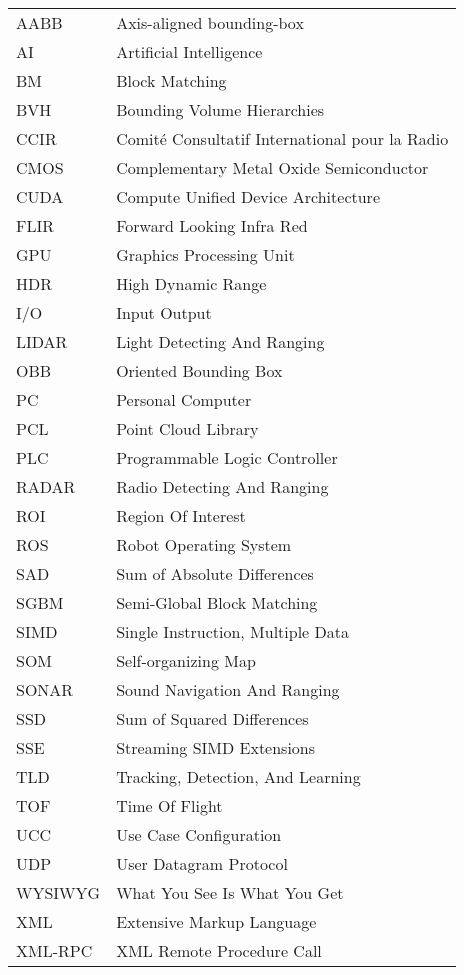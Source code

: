 \documentclass[12pt,a4paper,oneside,pdftex]{report}
\begin{document}
\noindent
\begin{longtable}{@{}p{}p{}@{}}
AABB & Axis-aligned bounding-box \\
AI & Artificial Intelligence \\
BM & Block Matching \\
BVH & Bounding Volume Hierarchies \\
CCIR & Comité Consultatif International pour la Radio \\
CMOS & Complementary Metal Oxide Semiconductor \\
CUDA & Compute Unified Device Architecture \\
FLIR & Forward Looking Infra Red \\
GPU & Graphics Processing Unit \\
HDR & High Dynamic Range \\
I/O & Input Output\\
LIDAR & Light Detecting And Ranging \\
OBB & Oriented Bounding Box \\
PC & Personal Computer \\
PCL & Point Cloud Library \\
PLC & Programmable Logic Controller \\
RADAR & Radio Detecting And Ranging \\
ROI & Region Of Interest \\
ROS & Robot Operating System \\
SAD & Sum of Absolute Differences \\
SGBM & Semi-Global Block Matching \\
SIMD & Single Instruction, Multiple Data \\
SOM & Self-organizing Map \\
SONAR & Sound Navigation And Ranging \\
SSD & Sum of Squared Differences \\
SSE & Streaming SIMD Extensions \\
TLD & Tracking, Detection, And Learning \\
TOF & Time Of Flight \\
UCC & Use Case Configuration \\
UDP & User Datagram Protocol \\
WYSIWYG & What You See Is What You Get \\
XML & Extensive Markup Language \\
XML-RPC & XML Remote Procedure Call \\ 
\end{longtable}
\end{document}
